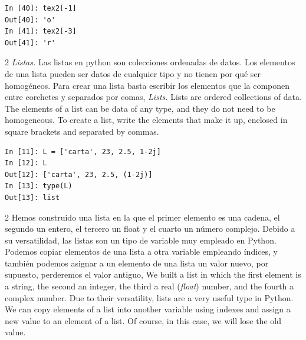 \begin{center}
    \begin{minipage}{0.3\textwidth}
\begin{verbatim}
In [40]: tex2[-1]
Out[40]: 'o'
In [41]: tex2[-3]
Out[41]: 'r'
\end{verbatim}
\end{minipage}
\end{center}

\begin{paracol}{2}
\emph{Listas.} Las listas en python son colecciones ordenadas de datos. Los elementos de una lista pueden ser datos de cualquier tipo y no tienen por qué ser homogéneos. Para crear una lista basta escribir los elementos que la componen entre corchetes y separados por comas,
\switchcolumn
\emph{Lists.} Lists are ordered collections of data. The elements of a list can be data of any type, and they do not need to be homogeneous. To create a list, write the elements that make it up, enclosed in square brackets and separated by commas.  
\end{paracol}

\begin{center}
    \begin{minipage}{0.4\textwidth}
\begin{verbatim}
In [11]: L = ['carta', 23, 2.5, 1-2j]
In [12]: L
Out[12]: ['carta', 23, 2.5, (1-2j)]
In [13]: type(L)
Out[13]: list
\end{verbatim}
\end{minipage}
\end{center}

\begin{paracol}{2}
Hemos construido una lista en la que el primer elemento es una cadena, el segundo un entero, el tercero un float y el cuarto un número complejo. Debido a su versatilidad, las listas son un tipo de variable muy empleado en Python. Podemos copiar elementos de una lista a otra variable empleando índices, y también podemos asignar a un elemento de una lista un valor nuevo, por supuesto, perderemos el valor antiguo,
\switchcolumn
We built a list in which the first element is a string, the second an integer, the third a real (\emph{float}) number, and the fourth a complex number. Due to their versatility, lists are a very useful type in Python. We can copy elements of a list into another variable using indexes and assign a new value to an element of a list. Of course, in this case, we will lose the old value. 
\end{paracol}

